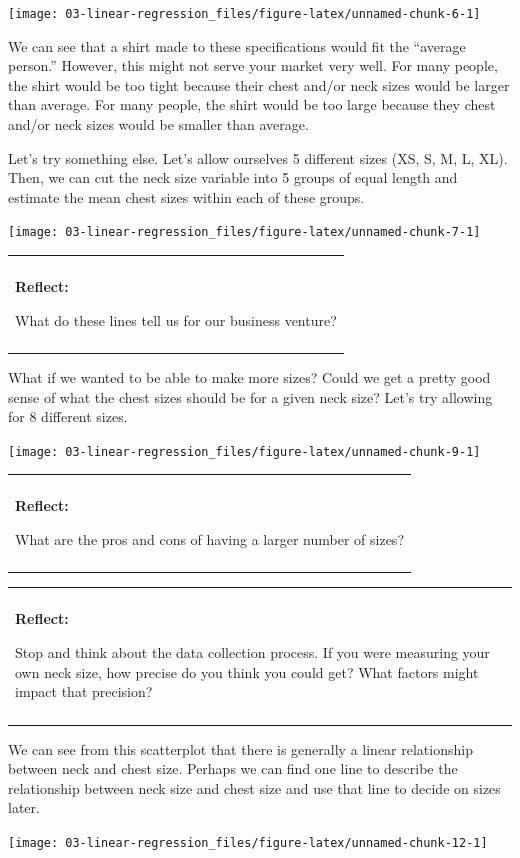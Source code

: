 \documentclass[
]{book}
\newenvironment{reflect}
{
    \begin{center}
    
    \begin{tabular}{|p{0.8\textwidth}|}
    \rowcolor{LightBlue}
    \hline\\
    \rowcolor{LightBlue}
    \textbf{Reflect:}
}
{
    \\\rowcolor{LightBlue}
    \\\hline
    \end{tabular} 
    \end{center}
}
\begin{document}
\begin{center}\texttt{[image: 03-linear-regression\_files/figure-latex/unnamed-chunk-6-1]} \end{center}

We can see that a shirt made to these specifications would fit the ``average person.'' However, this might not serve your market very well. For many people, the shirt would be too tight because their chest and/or neck sizes would be larger than average. For many people, the shirt would be too large because they chest and/or neck sizes would be smaller than average.

Let's try something else. Let's allow ourselves 5 different sizes (XS, S, M, L, XL). Then, we can cut the neck size variable into 5 groups of equal length and estimate the mean chest sizes within each of these groups.

\begin{center}\texttt{[image: 03-linear-regression\_files/figure-latex/unnamed-chunk-7-1]} \end{center}

\begin{reflect}
What do these lines tell us for our business venture?
\end{reflect}

What if we wanted to be able to make more sizes? Could we get a pretty good sense of what the chest sizes should be for a given neck size? Let's try allowing for 8 different sizes.

\begin{center}\texttt{[image: 03-linear-regression\_files/figure-latex/unnamed-chunk-9-1]} \end{center}

\begin{reflect}
What are the pros and cons of having a larger number of sizes?
\end{reflect}

\begin{reflect}
Stop and think about the data collection process. If you were measuring
your own neck size, how precise do you think you could get? What factors
might impact that precision?
\end{reflect}

We can see from this scatterplot that there is generally a linear relationship between neck and chest size. Perhaps we can find one line to describe the relationship between neck size and chest size and use that line to decide on sizes later.

\begin{center}\texttt{[image: 03-linear-regression\_files/figure-latex/unnamed-chunk-12-1]} \end{center}
\end{document}

